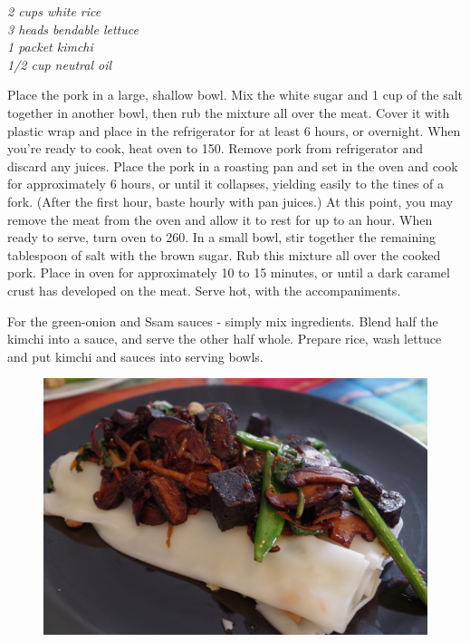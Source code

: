\documentclass{tufte-book}
\begin{document}

\emph{2 cups white rice
\\3 heads bendable lettuce
\\1 packet kimchi
\\1/2 cup neutral oil
}

Place the pork in a large, shallow bowl. Mix the white sugar and 1 cup of the salt together in another bowl, then rub the mixture all over the meat. Cover it with plastic wrap and place in the refrigerator for at least 6 hours, or overnight.
When you're ready to cook, heat oven to 150\celsius. Remove pork from refrigerator and discard any juices. Place the pork in a roasting pan and set in the oven and cook for approximately 6 hours, or until it collapses, yielding easily to the tines of a fork. (After the first hour, baste hourly with pan juices.) At this point, you may remove the meat from the oven and allow it to rest for up to an hour.
When ready to serve, turn oven to 260\celsius. In a small bowl, stir together the remaining tablespoon of salt with the brown sugar. Rub this mixture all over the cooked pork. Place in oven for approximately 10 to 15 minutes, or until a dark caramel crust has developed on the meat. Serve hot, with the accompaniments.

For the green-onion and Ssam sauces - simply mix ingredients. 
Blend half the kimchi into a sauce, and serve the other half whole.
Prepare rice, wash lettuce and put kimchi and sauces into serving bowls.

\newpage

\begin{figure}[h]
  \includegraphics[width=\linewidth]{blackpuddingragout.JPG}
\end{figure}
\end{document}
